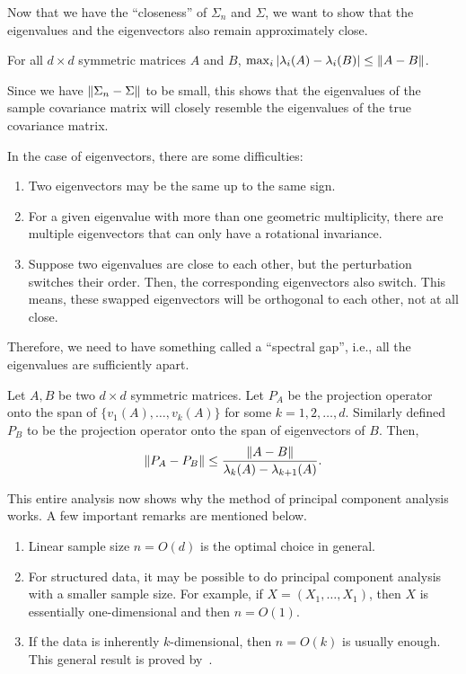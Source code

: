 \documentclass[12pt]{article}
\begin{document}
Now that we have the ``closeness'' of $\Sigma_n$ and $\Sigma$, we want to show that the eigenvalues and the eigenvectors also remain approximately close.

\begin{theorembox}
    For all $d \times d$ symmetric matrices $A$ and $B$, $\max_{i} \vert \lambda_i(A) - \lambda_i(B)\vert \leq \left\Vert A-B \right\Vert$.
\end{theorembox}
\noindent Since we have $\left\Vert \Sigma_n - \Sigma \right\Vert$ to be small, this shows that the eigenvalues of the sample covariance matrix will closely resemble the eigenvalues of the true covariance matrix.

In the case of eigenvectors, there are some difficulties:
\begin{enumerate}
    \item Two eigenvectors may be the same up to the same sign.
    \item For a given eigenvalue with more than one geometric multiplicity, there are multiple eigenvectors that can only have a rotational invariance.
    \item Suppose two eigenvalues are close to each other, but the perturbation switches their order. Then, the corresponding eigenvectors also switch. This means, these swapped eigenvectors will be orthogonal to each other, not at all close.
\end{enumerate}
\noindent Therefore, we need to have something called a ``spectral gap'', i.e., all the eigenvalues are sufficiently apart.

\begin{theorembox}
    Let $A, B$ be two $d \times d$ symmetric matrices. Let $P_A$ be the projection operator onto the span of $\{ v_1(A), \dots, v_k(A) \}$ for some $k = 1, 2, \dots, d$. Similarly defined $P_B$ to be the projection operator onto the span of eigenvectors of $B$. Then,
    \begin{equation*}
        \left\Vert P_A - P_B \right\Vert \leq \dfrac{\left\Vert A - B \right\Vert}{\lambda_k(A) - \lambda_{k+1}(A)}.
    \end{equation*}
\end{theorembox}

This entire analysis now shows why the method of principal component analysis works. A few important remarks are mentioned below.

\begin{note}
    \begin{enumerate}
        \item Linear sample size $n = O(d)$ is the optimal choice in general.
        \item For structured data, it may be possible to do principal component analysis with a smaller sample size. For example, if $X = (X_1, \dots, X_1)$, then $X$ is essentially one-dimensional and then $n = O(1)$.
        \item If the data is inherently $k$-dimensional, then $n = O(k)$ is usually enough. This general result is proved by~\cite{koltchinskii2017}.
    \end{enumerate}
\end{note}
\end{document}
